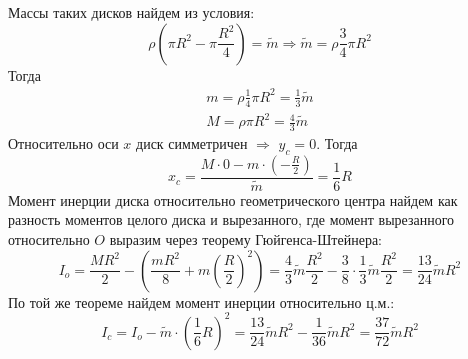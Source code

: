 \documentclass[a5paper,10pt]{article}
\begin{document}
Массы таких дисков найдем из условия:
\begin{equation}
	\rho(\pi R^2-\pi\frac{R^2}{4})=\tilde{m}
	\Rightarrow
	\tilde{m}=\rho\frac{3}{4}\pi R^2
\end{equation}
Тогда
\begin{gather}
	m=\rho \frac{1}{4} \pi R^2=\frac{1}{3}\tilde{m}\\
	M=\rho \pi R^2=\frac{4}{3}\tilde{m}
\end{gather}
Относительно оси $x$ диск симметричен $\Rightarrow$ $y_c=0$.
Тогда
\begin{equation}
	x_c=\frac{M\cdot0-m\cdot(-\frac{R}{2})}{\tilde{m}}=
	\frac{1}{6}R
\end{equation}
Момент инерции диска относительно геометрического центра найдем как разность моментов целого диска и вырезанного, где момент вырезанного относительно $O$ выразим через теорему Гюйгенса-Штейнера:
\begin{equation}
	I_o=\frac{MR^2}{2}-\left(\frac{mR^2}{8}+m\left(\frac{R}{2}\right)^2\right)=
	\frac{4}{3}\tilde{m}\frac{R^2}{2}-
	\frac{3}{8}\cdot\frac{1}{3}\tilde{m}\frac{R^2}{2}=\frac{13}{24}\tilde{m}R^2
\end{equation}
По той же теореме найдем момент инерции относительно ц.м.:
\begin{equation}
	I_c=I_o-\tilde{m}\cdot\left(\frac{1}{6}R\right)^2=
	\frac{13}{24}\tilde{m}R^2-\frac{1}{36}\tilde{m}R^2=
	\frac{37}{72}\tilde{m}R^2
\end{equation}
\end{document}
